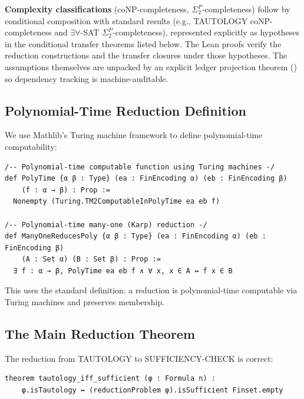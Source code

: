 \textbf{Complexity classifications} (coNP-completeness, $\Sigma_2^P$-completeness) follow by conditional composition with standard results (e.g., TAUTOLOGY coNP-completeness and $\exists\forall$-SAT $\Sigma_2^P$-completeness), represented explicitly as hypotheses in the conditional transfer theorems listed below. The Lean proofs verify the reduction constructions and the transfer closures under those hypotheses.
The assumptions themselves are unpacked by an explicit ledger projection theorem () so dependency tracking is machine-auditable.

\subsection{Polynomial-Time Reduction Definition}

We use Mathlib's Turing machine framework to define polynomial-time computability:

\begin{verbatim}
/-- Polynomial-time computable function using Turing machines -/
def PolyTime {α β : Type} (ea : FinEncoding α) (eb : FinEncoding β) 
    (f : α → β) : Prop :=
  Nonempty (Turing.TM2ComputableInPolyTime ea eb f)

/-- Polynomial-time many-one (Karp) reduction -/
def ManyOneReducesPoly {α β : Type} (ea : FinEncoding α) (eb : FinEncoding β)
    (A : Set α) (B : Set β) : Prop :=
  ∃ f : α → β, PolyTime ea eb f ∧ ∀ x, x ∈ A ↔ f x ∈ B
\end{verbatim}

This uses the standard definition: a reduction is polynomial-time computable via Turing machines and preserves membership.

\subsection{The Main Reduction Theorem}

\begin{theorem}
The reduction from TAUTOLOGY to SUFFICIENCY-CHECK is correct:
\end{theorem}

\begin{verbatim}
theorem tautology_iff_sufficient (φ : Formula n) :
    φ.isTautology ↔ (reductionProblem φ).isSufficient Finset.empty
\end{verbatim}

